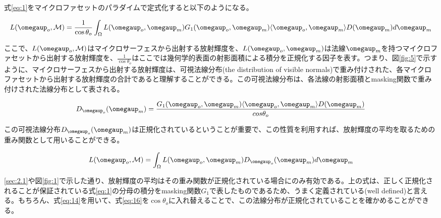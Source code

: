 \documentclass[a4paper,xelatex,ja=standard]{bxjsarticle}
\begin{document}
式\eqref{eq:1}をマイクロファセットのパラダイムで定式化すると以下のようになる。

\begin{equation}
    L(\boldsymbol{\omegaup}_o, \mathcal{M}) = \frac{1}{\cos\theta_o} \int_\Omega L(\boldsymbol{\omegaup}_o, \boldsymbol{\omegaup}_m) G_1(\boldsymbol{\omegaup}_o, \boldsymbol{\omegaup}_m) \langle \boldsymbol{\omegaup}_o, \boldsymbol{\omegaup}_m \rangle D(\boldsymbol{\omegaup}_m) d\boldsymbol{\omegaup}_m
    \label{eq:15}
\end{equation}

ここで、$L(\boldsymbol{\omegaup}_o, \mathcal{M})$はマイクロサーフェスから出射する放射輝度を、$L(\boldsymbol{\omegaup}_o, \boldsymbol{\omegaup}_m)$は法線$\boldsymbol{\omegaup}_m$を持つマイクロファセットから出射する放射輝度を、$\frac{1}{\cos\theta_o}$はここでは幾何学的表面の射影面積による積分を正規化する因子を表す。つまり、図\ref{fig:5}で示すように、マイクロサーフェスから出射する放射輝度は、可視法線分布(the distribution of visible normals)で重み付けされた、各マイクロファセットから出射する放射輝度の合計であると理解することができる。この可視法線分布は、各法線の射影面積とmasking関数で重み付けされた法線分布として表される。

\begin{equation}
    D_{\boldsymbol{\omegaup}_o}(\boldsymbol{\omegaup}_m) = \frac{G_1(\boldsymbol{\omegaup}_o, \boldsymbol{\omegaup}_m) \langle \boldsymbol{\omegaup}_o, \boldsymbol{\omegaup}_m \rangle D(\boldsymbol{\omegaup}_m)}{cos\theta_o}
    \label{eq:16}
\end{equation}

この可視法線分布$D_{\boldsymbol{\omegaup}_o}(\boldsymbol{\omegaup}_m)$は正規化されているということが重要で、この性質を利用すれば、放射輝度の平均を取るための重み関数として用いることができる。

\begin{equation}
    L(\boldsymbol{\omegaup}_o, \mathcal{M}) = \int_\Omega L(\boldsymbol{\omegaup}_o, \boldsymbol{\omegaup}_m) D_{\boldsymbol{\omegaup}_o}(\boldsymbol{\omegaup}_m) d\boldsymbol{\omegaup}_m
    \label{eq:17}
\end{equation}

\ref{sec:2.1}や図\ref{fig:1}で示した通り、放射輝度の平均はその重み関数が正規化されている場合にのみ有効である。上の式は、正しく正規化されることが保証されている式\eqref{eq:1}の分母の積分をmasking関数$G_1$で表したものであるため、うまく定義されている(well defined)と言える。もちろん、式\eqref{eq:14}を用いて、式\eqref{eq:16}を$\cos\theta_o$に入れ替えることで、この法線分布が正規化されていることを確かめることができる。
\end{document}
